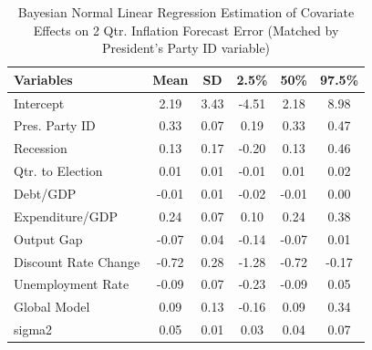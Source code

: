 \documentclass[a4paper]{article}\usepackage{graphicx, color}
\begin{document}
\begin{table}[ht]
\begin{center}
\caption{Bayesian Normal Linear Regression Estimation of Covariate Effects on 2 Qtr. Inflation Forecast Error (Matched by President's Party ID variable)}
\label{OutputPB}
{\small
\begin{tabular}{lccccc}
  \hline
Variables & Mean & SD & 2.5\% & 50\% & 97.5\% \\ 
  \hline
Intercept & 2.19 & 3.43 & -4.51 & 2.18 & 8.98 \\ 
  Pres. Party ID & 0.33 & 0.07 & 0.19 & 0.33 & 0.47 \\ 
  Recession & 0.13 & 0.17 & -0.20 & 0.13 & 0.46 \\ 
  Qtr. to Election & 0.01 & 0.01 & -0.01 & 0.01 & 0.02 \\ 
  Debt/GDP & -0.01 & 0.01 & -0.02 & -0.01 & 0.00 \\ 
  Expenditure/GDP & 0.24 & 0.07 & 0.10 & 0.24 & 0.38 \\ 
  Output Gap & -0.07 & 0.04 & -0.14 & -0.07 & 0.01 \\ 
  Discount Rate Change & -0.72 & 0.28 & -1.28 & -0.72 & -0.17 \\ 
  Unemployment Rate & -0.09 & 0.07 & -0.23 & -0.09 & 0.05 \\ 
  Global Model & 0.09 & 0.13 & -0.16 & 0.09 & 0.34 \\ 
  sigma2 & 0.05 & 0.01 & 0.03 & 0.04 & 0.07 \\ 
   \hline
\end{tabular}
}
\end{center}
\end{table}



\end{document}
